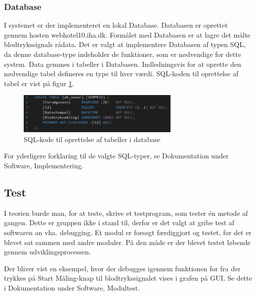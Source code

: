 \subsubsection{Database}
I systemet er der implementeret en lokal Database. Databasen er oprettet gennem hosten webhotel10.iha.dk. Formålet med Databasen er at lagre det målte blodtrykssignals rådata. Det er valgt at implementere Databasen af typen SQL, da denne database-type indeholder de funktioner, som er nødvendige for dette system. Data gemmes i tabeller i Databasen. Indledningsvis for at oprette den nødvendige tabel defineres en type til hver værdi. SQL-koden til oprettelse af tabel er vist på figur \ref{fig:SQL-kode}.
\begin{figure}[H]
	\centering
	\includegraphics[width=0.7\textwidth]{Figurer/SQLDatabase}
	\caption{SQL-kode til oprettelse af tabeller i database}
	\label{fig:SQL-kode}
\end{figure}
For yderligere forklaring til de valgte SQL-typer, se Dokumentation under Software, Implementering.

\subsection{Test}
I teorien burde man, for at teste, skrive et testprogram, som tester én metode af gangen. Dette er gruppen ikke i stand til, derfor er det valgt at gribe test af softwaren an vha. debugging. Et modul er forsøgt færdiggjort og testet, før det er blevet sat sammen med andre moduler. På den måde er der blevet testet løbende gennem udviklingsprocessen. \\ \newline

Der bliver vist en eksempel, hvor der debugges igennem funktionen for fra der trykkes på Start Måling-knap til blodtrykssignalet vises i grafen på GUI. Se dette i Dokumentation under Software, Modultest. 

